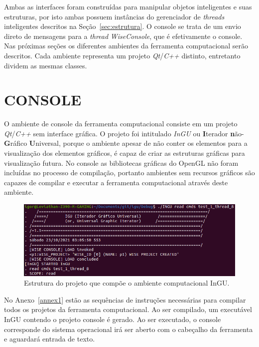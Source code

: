 Ambas as interfaces foram construídas para manipular objetos inteligentes e suas estruturas, por isto ambas possuem instâncias do gerenciador de \textit{threads} inteligentes descritos na Seção~\ref{sec:estrutura}. O console se trata de um envio direto de mensagens para a \textit{thread} \textit{WiseConsole}, que é efetivamente o console. Nas próximas seções os diferentes ambientes da ferramenta computacional serão descritos. Cada ambiente representa um projeto \textit{Qt}/\textit{C++} distinto, entretanto dividem as mesmas classes.

\section{CONSOLE}\label{sec:console}

O ambiente de console da ferramenta computacional consiste em um projeto \textit{Qt}/\textit{C++} sem interface gráfica. O projeto foi intitulado \textit{InGU} ou \textbf{I}terador \textbf{n}ão-\textbf{G}ráfico \textbf{U}niversal, porque o ambiente apesar de não conter os elementos para a visualização dos elementos gráficos, é capaz de criar as estruturas gráficas para visualização futura.  No console as bibliotecas gráficas do OpenGL não foram incluídas no processo de compilação, portanto ambientes sem recursos gráficos são capazes de compilar e executar a ferramenta computacional através deste ambiente.

\begin{figure}[!htbp]
	\centering
	\includegraphics[width=\linewidth]{Figures/InGU.png}
	\caption{Estrutura do projeto que compõe o ambiente computacional InGU.}
	\label{fig10:console}
\end{figure}

No Anexo~\ref{annex1} estão as sequências de instruções necessárias para compilar todos os projetos da ferramenta computacional. Ao ser compilado, um executável InGU contendo o projeto console é gerado. Ao ser executado, o console corresponde do sistema operacional irá ser aberto com o cabeçalho da ferramenta e aguardará entrada de texto.

